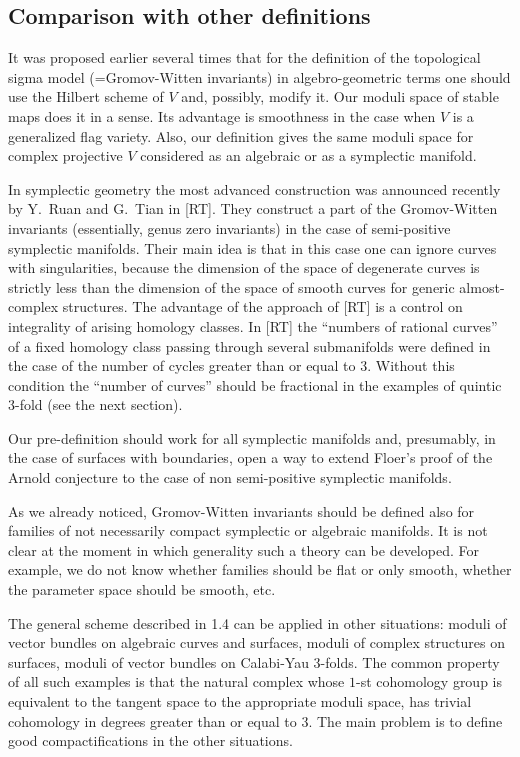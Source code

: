 \documentclass{amsart}
\begin{document}
\subsection{Comparison with other definitions}


It was proposed earlier several times that for the definition of the
topological sigma model (=Gromov-Witten invariants) in algebro-geometric terms
one should use the Hilbert scheme of $V$  and, possibly, modify it. Our moduli
space of stable maps does it in a sense. Its advantage is smoothness in the
case when $V$ is a generalized flag variety.
 Also, our definition gives the same moduli space for complex projective $V$
considered as an algebraic or as a symplectic manifold.


In symplectic geometry the most advanced construction was announced recently by
Y.~Ruan and G.~Tian in [RT]. They construct a part of the Gromov-Witten
invariants (essentially, genus zero invariants) in the case of semi-positive
symplectic manifolds. Their main idea is that in this case one can ignore
curves with singularities, because the dimension of the space of degenerate
curves is strictly less than the dimension of the space of smooth curves for
generic almost-complex structures. The advantage of the approach of [RT] is a
control on integrality of arising homology classes.
 In [RT] the  ``numbers of rational curves'' of a fixed homology class passing
through several submanifolds were defined in the case of the number of cycles
greater than or equal to $3$. Without this condition the ``number of curves''
should be fractional in the examples of quintic 3-fold (see the next section).

Our pre-definition should work for all symplectic manifolds and, presumably, in
the case of surfaces with boundaries, open a way to extend Floer's proof of the
Arnold conjecture to the case of non semi-positive symplectic manifolds.

As we already noticed, Gromov-Witten invariants should be defined    also for
families of not necessarily compact symplectic or algebraic manifolds. It is
not clear at the moment in which generality such a theory can be developed. For
example, we do not know whether families should  be flat or only smooth,
whether  the parameter space  should be smooth, etc.


The general scheme described in 1.4 can be applied in other  situations: moduli
 of vector bundles on algebraic curves and surfaces, moduli  of complex
structures on surfaces, moduli of vector bundles on Calabi-Yau 3-folds. The
common property of all such examples is that the natural complex whose $1$-st
cohomology group is equivalent to the tangent space to the appropriate moduli
space, has trivial cohomology in degrees greater than or equal to $3$. The main
 problem
 is to define  good compactifications in the other situations.
\end{document}
